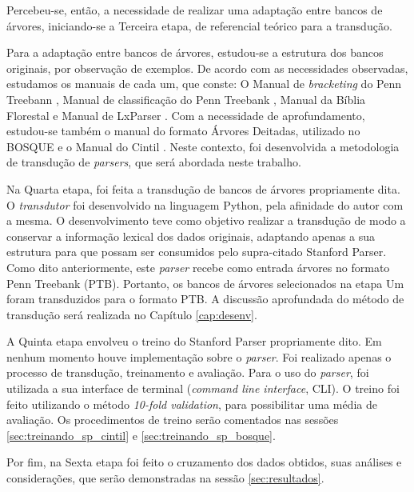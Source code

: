 Percebeu-se, então, a necessidade de realizar uma adaptação entre bancos de árvores, iniciando-se a Terceira etapa, de referencial teórico para a transdução.

Para a adaptação entre bancos de árvores, estudou-se a estrutura dos bancos originais, por observação de exemplos. De acordo com as necessidades observadas, estudamos os manuais de cada um, que conste: O Manual de \textit{bracketing} do Penn Treebann \cite{bracketing_ptb}, Manual de classificação do Penn Treebank \cite{buildingPTB}, Manual da Bíblia Florestal \cite{freitas2007biblia} e Manual de LxParser \cite{siteLxParser}. Com a necessidade de aprofundamento, estudou-se também o manual do formato 
Árvores Deitadas, utilizado no BOSQUE \cite{afonso2006arvores} e o Manual do Cintil \cite{cintil_handbook}. Neste contexto, foi desenvolvida a metodologia de transdução de \textit{parsers}, que será abordada neste trabalho. 

Na Quarta etapa, foi feita a transdução de bancos de árvores propriamente dita. O \textit{transdutor} foi desenvolvido na linguagem Python, pela afinidade do autor com a mesma. O desenvolvimento teve como objetivo realizar a transdução de modo a conservar a informação lexical dos dados originais, adaptando apenas a sua estrutura para que possam ser consumidos pelo supra-citado Stanford Parser. Como dito anteriormente, este \textit{parser} recebe como entrada árvores no formato Penn Treebank (PTB). Portanto, os bancos de árvores selecionados na etapa Um foram transduzidos para o formato PTB.
A discussão aprofundada do método de transdução será realizada no Capítulo \ref{cap:desenv}.

A Quinta etapa envolveu o treino do Stanford Parser propriamente dito. Em nenhum momento houve implementação sobre o \textit{parser}. Foi realizado apenas o processo de transdução, treinamento e avaliação. Para o uso do \textit{parser}, foi utilizada a sua interface de terminal (\textit{command line interface}, CLI). O treino foi feito utilizando o método \textit{10-fold validation}, para possibilitar uma média de avaliação. Os procedimentos de treino serão comentados nas sessões \ref{sec:treinando_sp_cintil} e \ref{sec:treinando_sp_bosque}.


Por fim, na Sexta etapa foi feito o cruzamento dos dados obtidos, suas análises e considerações, que serão demonstradas na sessão \ref{sec:resultados}. 